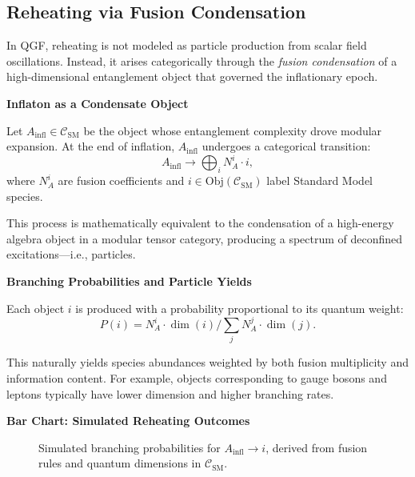 \documentclass[11pt]{article}
\def\frac#1#2{#1/#2}
\begin{document}
\subsection{Reheating via Fusion Condensation}

In QGF, reheating is not modeled as particle production from scalar field oscillations. Instead, it arises categorically through the \textit{fusion condensation} of a high-dimensional entanglement object that governed the inflationary epoch.

\vspace{0.5em}
\noindent\textbf{Inflaton as a Condensate Object}

Let \( A_{\text{infl}} \in \mathcal{C}_{\text{SM}} \) be the object whose entanglement complexity drove modular expansion. At the end of inflation, \( A_{\text{infl}} \) undergoes a categorical transition:
\[
A_{\text{infl}} \rightarrow \bigoplus_{i} N_A^i \cdot i,
\]
where \( N_A^i \) are fusion coefficients and \( i \in \text{Obj}(\mathcal{C}_{\text{SM}}) \) label Standard Model species.

This process is mathematically equivalent to the condensation of a high-energy algebra object in a modular tensor category, producing a spectrum of deconfined excitations—i.e., particles.

\vspace{0.5em}
\noindent\textbf{Branching Probabilities and Particle Yields}

Each object \( i \) is produced with a probability proportional to its quantum weight:
\[
P(i) = \frac{N_A^i \cdot \dim(i)}{\sum_j N_A^j \cdot \dim(j)}.
\]

This naturally yields species abundances weighted by both fusion multiplicity and information content. For example, objects corresponding to gauge bosons and leptons typically have lower dimension and higher branching rates.

\vspace{0.5em}
\noindent\textbf{Bar Chart: Simulated Reheating Outcomes}

\begin{figure}[H]
\centering
{}
\caption{Simulated branching probabilities for \( A_{\text{infl}} \rightarrow i \), derived from fusion rules and quantum dimensions in \( \mathcal{C}_{\text{SM}} \).}
\label{fig:reheat-bar}
\end{figure}
\end{document}

